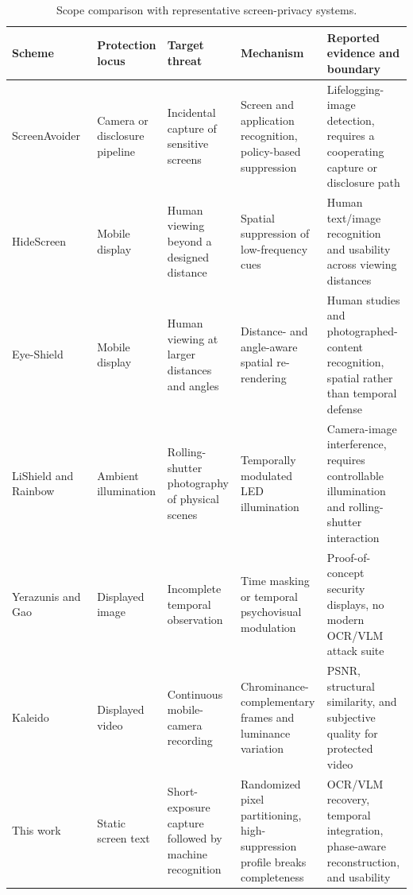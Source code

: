 \documentclass{ieeeaccess}
\begin{document}
\begin{table}[!t]
\caption{Scope comparison with representative screen-privacy systems.}
\label{tab:kaleido_compare}
\centering
\footnotesize
\setlength{\tabcolsep}{2.8pt}
\begin{tabular}{>{\raggedright\arraybackslash}p{}>{\raggedright\arraybackslash}p{}>{\raggedright\arraybackslash}p{}>{\raggedright\arraybackslash}p{}>{\raggedright\arraybackslash}p{}}
\toprule
Scheme & Protection locus & Target threat & Mechanism & Reported evidence and boundary \\
\midrule
ScreenAvoider~\cite{b_screenavoider2014} & Camera or disclosure pipeline & Incidental capture of sensitive screens & Screen and application recognition, policy-based suppression & Lifelogging-image detection, requires a cooperating capture or disclosure path \\
HideScreen~\cite{b_hidescreen2019} & Mobile display & Human viewing beyond a designed distance & Spatial suppression of low-frequency cues & Human text/image recognition and usability across viewing distances \\
Eye-Shield~\cite{b_tang2023} & Mobile display & Human viewing at larger distances and angles & Distance- and angle-aware spatial re-rendering & Human studies and photographed-content recognition, spatial rather than temporal defense \\
LiShield and Rainbow~\cite{b_zhu2017,b_rainbow2018} & Ambient illumination & Rolling-shutter photography of physical scenes & Temporally modulated LED illumination & Camera-image interference, requires controllable illumination and rolling-shutter interaction \\
Yerazunis and Gao~\cite{b_yerazunis2001,b_gao2014} & Displayed image & Incomplete temporal observation & Time masking or temporal psychovisual modulation & Proof-of-concept security displays, no modern OCR/VLM attack suite \\
Kaleido~\cite{b_kaleido2015} & Displayed video & Continuous mobile-camera recording & Chrominance-complementary frames and luminance variation & PSNR, structural similarity, and subjective quality for protected video \\
This work & Static screen text & Short-exposure capture followed by machine recognition & Randomized pixel partitioning, high-suppression profile breaks completeness & OCR/VLM recovery, temporal integration, phase-aware reconstruction, and usability \\
\bottomrule
\end{tabular}
\end{table}
\end{document}
